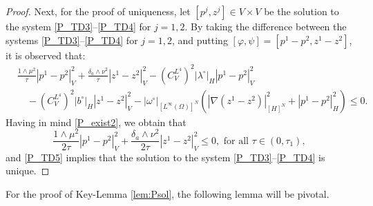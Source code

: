 \documentclass{sinst}
\numberwithin{equation}{section}
\theoremstyle{plain}
\theoremstyle{definition}
\begin{document}
\begin{proof}
  Next, for the proof of uniqueness, let $[p^j, z^j] \in V \times V$ be the solution to the system \eqref{P_TD3}--\eqref{P_TD4} for $j = 1,2$. By taking the difference between the systems \eqref{P_TD3}--\eqref{P_TD4} for $j=1,2$, and putting $[\varphi,\psi] = [p^1 - p^2, z^1 - z^2]$, it is observed that:
  \begin{align}
    &\frac{1 \wedge \mu^2}{\tau}|p^1 - p^2|_V^2 + \frac{\delta_a \wedge \nu^2}{\tau}|z^1 - z^2|_V^2 - (C_V^{L^4})^2 |\lambda^\circ|_H |p^1 - p^2|_V^2 
    \\
    &\quad - (C_V^{L^4})^2 |b^\circ|_H |z^1 - z^2|_V^2 - |\omega^\circ|_{[L^\infty(\Omega)]^N} (|\nabla (z^1 - z^2)|_{[H]^N}^2 + |p^1 - p^2|_H^2) \leq 0.
  \end{align}
  Having in mind \eqref{P_exist2}, we obtain that
  \begin{equation}
    \frac{1 \wedge \mu^2}{2\tau}|p^1 - p^2|_V^2 + \frac{\delta_a \wedge \nu^2}{2\tau}|z^1 - z^2|_V^2 \leq 0, \mbox{ for all } \tau \in (0,\tau_1), \label{P_TD5}
  \end{equation}
  and \eqref{P_TD5} implies that the solution to the system \eqref{P_TD3}--\eqref{P_TD4} is unique.
\end{proof}

For the proof of Key-Lemma \ref{lem:Psol}, the following lemma will be pivotal.
\end{document}
